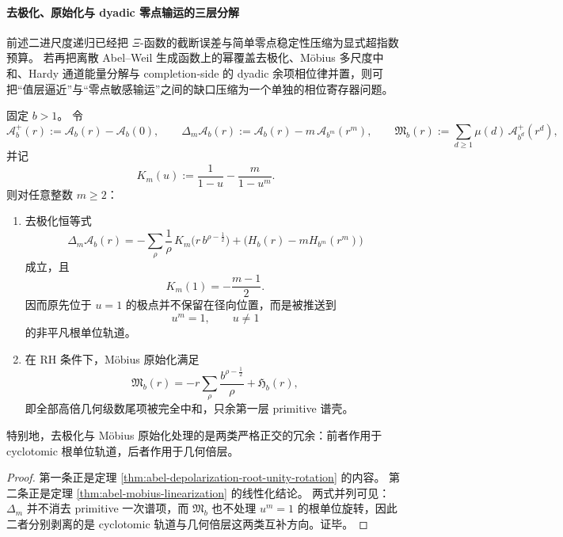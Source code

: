 \paragraph{去极化、原始化与 dyadic 零点输运的三层分解}
前述二进尺度递归已经把 \(\Xi\)-函数的截断误差与简单零点稳定性压缩为显式超指数预算。
若再把离散 Abel--Weil 生成函数上的幂覆盖去极化、M\"obius 多尺度中和、Hardy 通道能量分解与 completion-side 的 dyadic 余项相位律并置，则可把“值层逼近”与“零点敏感输运”之间的缺口压缩为一个单独的相位寄存器问题。

\begin{theorem}\label{thm:conclusion-xi-depolarization-mobius-orthogonality}
固定 \(b>1\)。
令
\[
\mathcal A_b^+(r):=\mathcal A_b(r)-\mathcal A_b(0),
\qquad
\Delta_m\mathcal A_b(r):=\mathcal A_b(r)-m\,\mathcal A_{b^m}(r^m),
\qquad
\mathfrak M_b(r):=\sum_{d\ge 1}\mu(d)\,\mathcal A_{b^d}^+(r^d),
\]
并记
\[
K_m(u):=\frac{1}{1-u}-\frac{m}{1-u^m}.
\]
则对任意整数 \(m\ge 2\)：
\begin{enumerate}
  \item 去极化恒等式
  \[
  \Delta_m\mathcal A_b(r)
  =
  -\sum_{\rho}\frac{1}{\rho}\,K_m\!\bigl(r\,b^{\rho-\frac12}\bigr)
  +\bigl(H_b(r)-mH_{b^m}(r^m)\bigr)
  \]
  成立，且
  \[
  K_m(1)=-\frac{m-1}{2}.
  \]
  因而原先位于 \(u=1\) 的极点并不保留在径向位置，而是被推送到
  \[
  u^m=1,\qquad u\neq 1
  \]
  的非平凡根单位轨道。

  \item 在 RH 条件下，M\"obius 原始化满足
  \[
  \mathfrak M_b(r)
  =
  -r\sum_{\rho}\frac{b^{\rho-\frac12}}{\rho}
  +\mathfrak H_b(r),
  \]
  即全部高倍几何级数尾项被完全中和，只余第一层 primitive 谱壳。
\end{enumerate}
特别地，去极化与 M\"obius 原始化处理的是两类严格正交的冗余：前者作用于 cyclotomic 根单位轨道，后者作用于几何倍层。
\end{theorem}
\begin{proof}
第一条正是定理 \ref{thm:abel-depolarization-root-unity-rotation} 的内容。
第二条正是定理 \ref{thm:abel-mobius-linearization} 的线性化结论。
两式并列可见：\(\Delta_m\) 并不消去 primitive 一次谱项，而 \(\mathfrak M_b\) 也不处理 \(u^m=1\) 的根单位旋转，因此二者分别剥离的是 cyclotomic 轨道与几何倍层这两类互补方向。证毕。
\end{proof}

